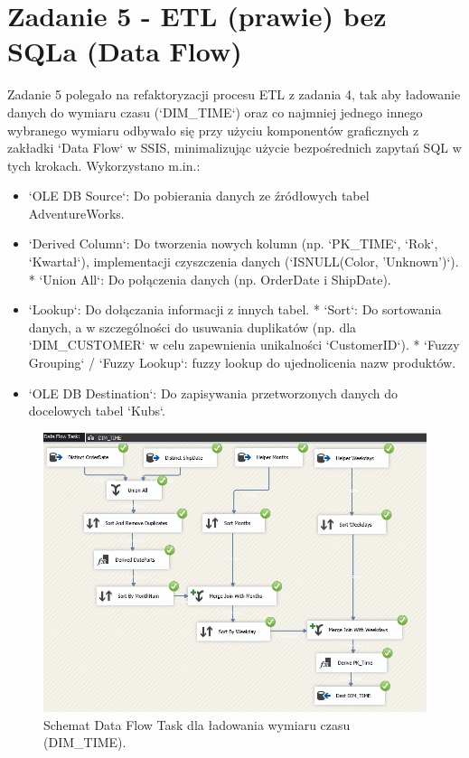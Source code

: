 \documentclass[a4paper,12pt]{article}
\begin{document}
\section{Zadanie 5 - ETL (prawie) bez SQLa (Data Flow)}

Zadanie 5 polegało na refaktoryzacji procesu ETL z zadania 4, tak aby ładowanie danych do wymiaru czasu (`DIM\_TIME`) oraz co najmniej jednego innego wybranego wymiaru odbywało się przy użyciu komponentów graficznych z zakładki `Data Flow` w SSIS, minimalizując użycie bezpośrednich zapytań SQL w tych krokach. Wykorzystano m.in.:
\begin{itemize}
    \item `OLE DB Source`: Do pobierania danych ze źródłowych tabel AdventureWorks.
    \item `Derived Column`: Do tworzenia nowych kolumn (np. `PK\_TIME`, `Rok`, `Kwartał`), implementacji czyszczenia danych (`ISNULL(Color, 'Unknown')`).
          *   `Union All`: Do połączenia danych (np. OrderDate i ShipDate).
    \item `Lookup`: Do dołączania informacji z innych tabel.
          *   `Sort`: Do sortowania danych, a w szczególności do usuwania duplikatów (np. dla `DIM\_CUSTOMER` w celu zapewnienia unikalności `CustomerID`).
          *   `Fuzzy Grouping` / `Fuzzy Lookup`: fuzzy lookup do ujednolicenia nazw produktów.
    \item `OLE DB Destination`: Do zapisywania przetworzonych danych do docelowych tabel `Kubs`.
\end{itemize}

\begin{figure}[H]
    \centering
    \includegraphics[width=\textwidth]{images/5_time.png}
    \caption{Schemat Data Flow Task dla ładowania wymiaru czasu (DIM\_TIME).}
    \label{fig:zad5_dft_dim_time}
\end{figure}
\end{document}
